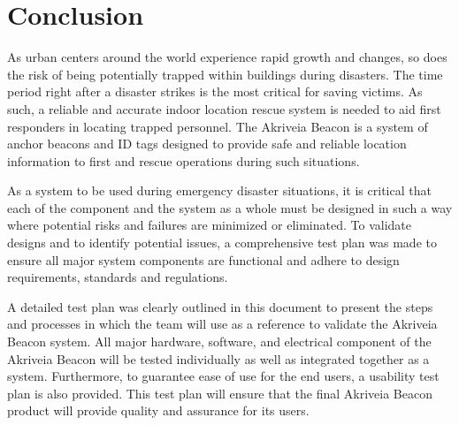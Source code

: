 

\setcounter{section}{6}
\section{Conclusion}
\bigskip

As urban centers around the world experience rapid growth and changes, so does the risk of being potentially trapped within buildings during disasters. The time period right after a disaster strikes is the most critical for saving victims. As such, a reliable and accurate indoor location rescue system is needed to aid first responders in locating trapped personnel. The Akriveia Beacon is a system of anchor beacons and ID tags designed to provide safe and reliable location information to first and rescue operations during such situations. 

\bigskip
As a system to be used during emergency disaster situations, it is critical that each of the component and the system as a whole must be designed in such a way where potential risks and failures are minimized or eliminated. To validate designs and to identify potential issues, a comprehensive test plan was made to ensure all major system components are functional and adhere to design requirements, standards and regulations. 

\bigskip
A detailed test plan was clearly outlined in this document to present the steps and processes in which the team will use as a reference to validate the Akriveia Beacon system. All major hardware, software, and electrical component of the Akriveia Beacon will be tested individually as well as integrated together as a system. Furthermore, to guarantee ease of use for the end users, a usability test plan is also provided. This test plan will ensure that the final Akriveia Beacon product will provide quality and assurance for its users.
